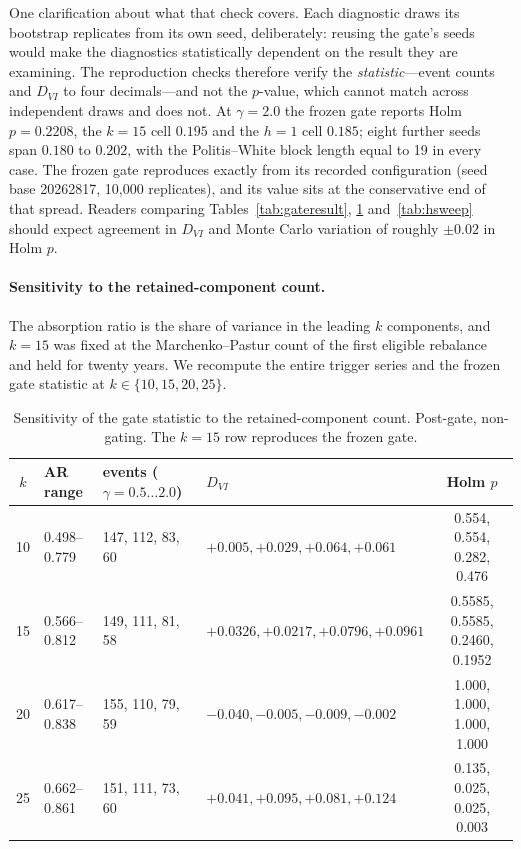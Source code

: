 \documentclass[12pt,letterpaper]{article}
\begin{document}
One clarification about what that check covers. Each diagnostic draws its bootstrap
replicates from its own seed, deliberately: reusing the gate's seeds would make the
diagnostics statistically dependent on the result they are examining. The reproduction checks
therefore verify the \emph{statistic}---event counts and $D_{VI}$ to four decimals---and not
the $p$-value, which cannot match across independent draws and does not. At $\gamma = 2.0$ the frozen gate reports Holm $p = 0.2208$, the $k = 15$ cell $0.195$ and
the $h = 1$ cell $0.185$;
eight further seeds span $0.180$ to $0.202$, with the Politis--White block length equal to 19
in every case. The frozen gate reproduces exactly from its recorded configuration (seed base
20262817, 10{,}000 replicates), and its value sits at the conservative end of that spread.
Readers comparing Tables~\ref{tab:gateresult}, \ref{tab:ksweep} and~\ref{tab:hsweep} should expect
agreement in $D_{VI}$ and Monte Carlo variation of roughly $\pm 0.02$ in Holm $p$.

\paragraph{Sensitivity to the retained-component count.}
The absorption ratio is the share of variance in the leading $k$ components, and
$k = 15$ was fixed at the Marchenko--Pastur count of the first eligible rebalance and
held for twenty years. We recompute the entire trigger series and the frozen gate
statistic at $k \in \{10, 15, 20, 25\}$.

\begin{table}[htbp]
\centering
\caption{Sensitivity of the gate statistic to the retained-component count. Post-gate,
non-gating. The $k = 15$ row reproduces the frozen gate.}
\label{tab:ksweep}
\small
\begin{tabular}{clllc}
\toprule
$k$ & AR range & events ($\gamma = 0.5 \dots 2.0$) & $D_{VI}$ & Holm $p$ \\
\midrule
10 & 0.498--0.779 & 147, 112, 83, 60 & $+0.005, +0.029, +0.064, +0.061$ & 0.554, 0.554, 0.282, 0.476 \\
15 & 0.566--0.812 & 149, 111, 81, 58 & $+0.0326, +0.0217, +0.0796, +0.0961$ & 0.5585, 0.5585, 0.2460, 0.1952 \\
20 & 0.617--0.838 & 155, 110, 79, 59 & $-0.040, -0.005, -0.009, -0.002$ & 1.000, 1.000, 1.000, 1.000 \\
25 & 0.662--0.861 & 151, 111, 73, 60 & $+0.041, +0.095, +0.081, +0.124$ & 0.135, 0.025, 0.025, 0.003 \\
\bottomrule
\end{tabular}
\end{table}
\end{document}
